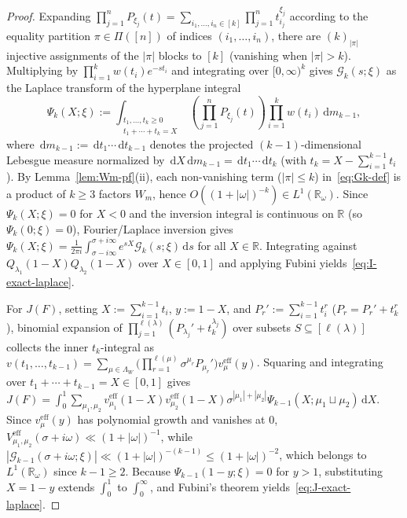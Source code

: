\documentclass[11pt, reqno]{amsart}
\theoremstyle{remark}
\numberwithin{equation}{section}
\newcommand{\R}{\mathbb{R}}
\newcommand{\cG}{\mathcal{G}}
\newcommand{\dd}{\,\mathrm{d}}
\begin{document}
\begin{proof}
Expanding $\prod_{j=1}^n P_{\xi_j}(t) = \sum_{i_1,\dots,i_n \in [k]} \prod_{j=1}^n t_{i_j}^{\xi_j}$
according to the equality partition $\pi \in \Pi([n])$ of indices $(i_1,\dots,i_n)$, there are
$(k)_{|\pi|}$ injective assignments of the $|\pi|$ blocks to $[k]$ (vanishing when $|\pi| > k$).
Multiplying by $\prod_{i=1}^k w(t_i) e^{-s t_i}$ and integrating over $[0,\infty)^k$ gives $\cG_k(s; \xi)$
as the Laplace transform of the hyperplane integral
\[
\Psi_k(X; \xi) := \int_{\substack{t_1,\dots,t_k \ge 0 \\ t_1+\cdots+t_k = X}}
\left(\prod_{j=1}^n P_{\xi_j}(t)\right) \prod_{i=1}^k w(t_i)\dd m_{k-1},
\]
where $\dd m_{k-1} := \dd t_1\cdots\dd t_{k-1}$ denotes the projected $(k-1)$-dimensional Lebesgue
measure normalized by $\dd X \dd m_{k-1} = \dd t_1\cdots\dd t_k$ (with $t_k = X - \sum_{i=1}^{k-1} t_i$).
By Lemma~\ref{lem:Wm-pf}(ii), each non-vanishing term ($|\pi| \le k$) in~\eqref{eq:Gk-def} is
a product of $k \ge 3$ factors $W_m$, hence $O((1+|\omega|)^{-k}) \in L^1(\R_\omega)$. Since $\Psi_k(X;\xi) = 0$
for $X < 0$ and the inversion integral is continuous on $\R$ (so $\Psi_k(0;\xi) = 0$), Fourier/Laplace inversion
gives $\Psi_k(X;\xi) = \frac{1}{2\pi i}\int_{\sigma-i\infty}^{\sigma+i\infty} e^{sX}\cG_k(s;\xi)\dd s$ for all $X \in \R$.
Integrating against $Q_{\lambda_1}(1-X) Q_{\lambda_2}(1-X)$ over $X \in [0,1]$ and applying Fubini yields~\eqref{eq:I-exact-laplace}.

For $J(F)$, setting $X := \sum_{i=1}^{k-1} t_i$, $y := 1 - X$, and $P_r' := \sum_{i=1}^{k-1} t_i^r$
($P_r = P_r' + t_k^r$), binomial expansion of $\prod_{j=1}^{\ell(\lambda)} (P_{\lambda_j}' + t_k^{\lambda_j})$
over subsets $S \subseteq [\ell(\lambda)]$ collects the inner $t_k$-integral as
$v(t_1,\dots,t_{k-1}) = \sum_{\mu \in \Lambda_W} \bigl(\prod_{r=1}^{\ell(\mu)} \sigma^{\mu_r} P_{\mu_r}'\bigr) v_\mu^{\mathrm{eff}}(y)$.
Squaring and integrating over $t_1 + \cdots + t_{k-1} = X \in [0,1]$ gives
$J(F) = \int_0^1 \sum_{\mu_1,\mu_2} v_{\mu_1}^{\mathrm{eff}}(1-X) v_{\mu_2}^{\mathrm{eff}}(1-X)
\sigma^{|\mu_1|+|\mu_2|} \Psi_{k-1}(X; \mu_1\sqcup\mu_2)\dd X$.
Since $v_\mu^{\mathrm{eff}}(y)$ has polynomial growth and vanishes at $0$, $V_{\mu_1,\mu_2}^{\mathrm{eff}}(\sigma+i\omega) \ll (1+|\omega|)^{-1}$,
while $|\cG_{k-1}(\sigma+i\omega;\xi)| \ll (1+|\omega|)^{-(k-1)} \le (1+|\omega|)^{-2}$, which belongs to
$L^1(\R_\omega)$ since $k - 1 \ge 2$.
Because $\Psi_{k-1}(1-y;\xi) = 0$ for $y > 1$, substituting $X = 1-y$ extends $\int_0^1$ to $\int_0^\infty$, and Fubini's theorem yields~\eqref{eq:J-exact-laplace}.
\end{proof}
\end{document}
